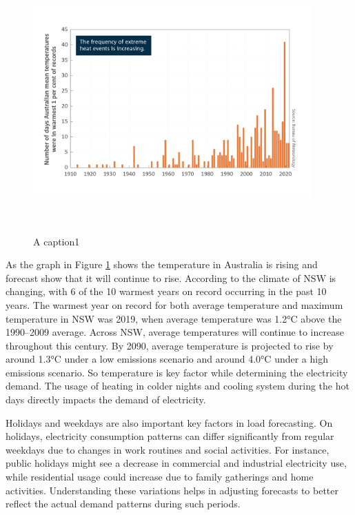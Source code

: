 \documentclass[mstat,12pt]{unswthesis}
\begin{document}
\begin{figure}[H]
\centering
\includegraphics[width=0.95\textwidth, height=10cm]{extreme_temp__au.png}
\caption{A caption1}\label{extreme}
\end{figure}

As the graph in Figure \ref{extreme} shows the temperature in Australia
is rising and forecast show that it will continue to rise. According to
\cite{nswAdaptNSW} the climate of NSW is changing, with 6 of the 10
warmest years on record occurring in the past 10 years. The warmest year
on record for both average temperature and maximum temperature in NSW
was 2019, when average temperature was 1.2°C above the 1990--2009
average. Across NSW, average temperatures will continue to increase
throughout this century. By 2090, average temperature is projected to
rise by around 1.3°C under a low emissions scenario and around 4.0°C
under a high emissions scenario. So temperature is key factor while
determining the electricity demand. The usage of heating in colder
nights and cooling system during the hot days directly impacts the
demand of electricity.

Holidays and weekdays are also important key factors in load
forecasting. On holidays, electricity consumption patterns can differ
significantly from regular weekdays due to changes in work routines and
social activities. For instance, public holidays might see a decrease in
commercial and industrial electricity use, while residential usage could
increase due to family gatherings and home activities. Understanding
these variations helps in adjusting forecasts to better reflect the
actual demand patterns during such periods.
\end{document}
